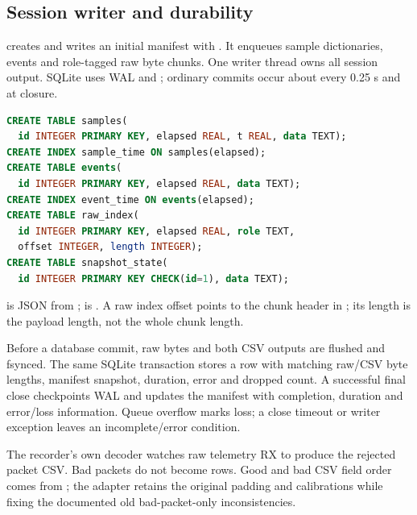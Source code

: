 \subsection{Session writer and durability}
 creates
 and writes an initial manifest with
. It enqueues sample dictionaries, events and role-tagged
raw byte chunks. One writer thread owns all session output. SQLite uses WAL and
; ordinary commits occur about every 0.25 s and at closure.

\begin{lstlisting}[language=SQL]
CREATE TABLE samples(
  id INTEGER PRIMARY KEY, elapsed REAL, t REAL, data TEXT);
CREATE INDEX sample_time ON samples(elapsed);
CREATE TABLE events(
  id INTEGER PRIMARY KEY, elapsed REAL, data TEXT);
CREATE INDEX event_time ON events(elapsed);
CREATE TABLE raw_index(
  id INTEGER PRIMARY KEY, elapsed REAL, role TEXT,
  offset INTEGER, length INTEGER);
CREATE TABLE snapshot_state(
  id INTEGER PRIMARY KEY CHECK(id=1), data TEXT);
\end{lstlisting}
 is JSON from ;
 is .
A raw index offset points to the chunk header in ; its length is
the payload length, not the whole chunk length.

Before a database commit, raw bytes and both CSV outputs are flushed and fsynced.
The same SQLite transaction stores a  row with matching
raw/CSV byte lengths, manifest snapshot, duration, error and dropped count.
A successful final close checkpoints WAL and updates the manifest with completion,
duration and error/loss information. Queue overflow marks loss; a close timeout
or writer exception leaves an incomplete/error condition.

The recorder's own decoder watches raw telemetry RX to produce the rejected
packet CSV. Bad packets do not become  rows. Good and bad CSV field
order comes from ; the adapter retains the original padding and
calibrations while fixing the documented old bad-packet-only inconsistencies.

